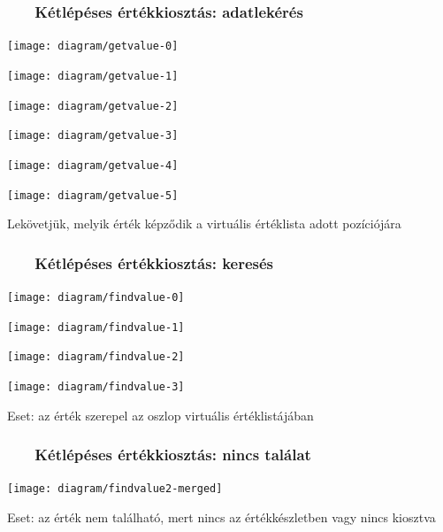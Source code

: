 \documentclass[
    aspectratio=169,
]{beamer}
\newcommand{\slidetitle}[2]{\frametitle{{\small #1 ~ \ding{226} ~ } \normalsize \textbf{#2} }}
\begin{document}
\begin{frame}
    \slidetitle{\sectionshorttitle}{Kétlépéses értékkiosztás: adatlekérés}
    
    \centering
    
    \begin{overprint}
        \centerline{\texttt{[image: diagram/getvalue-0]}}
        \centerline{\texttt{[image: diagram/getvalue-1]}}
        \centerline{\texttt{[image: diagram/getvalue-2]}}
        \centerline{\texttt{[image: diagram/getvalue-3]}}
        \centerline{\texttt{[image: diagram/getvalue-4]}}
        \centerline{\texttt{[image: diagram/getvalue-5]}}
    \end{overprint}
    
    \hspace{0.7cm}
    
    Lekövetjük, melyik érték képződik a virtuális értéklista adott pozíciójára
\end{frame}

\begin{frame}
    \slidetitle{\sectionshorttitle}{Kétlépéses értékkiosztás: keresés}
    
    \centering
    
    \begin{overprint}
        \centerline{\texttt{[image: diagram/findvalue-0]}}
        \centerline{\texttt{[image: diagram/findvalue-1]}}
        \centerline{\texttt{[image: diagram/findvalue-2]}}
        \centerline{\texttt{[image: diagram/findvalue-3]}}
    \end{overprint}
    
    \vspace{0.7cm}
    
    Eset: az érték szerepel az oszlop virtuális értéklistájában
\end{frame}

\begin{frame}
    \slidetitle{\sectionshorttitle}{Kétlépéses értékkiosztás: nincs találat}
    
    \centering
    
    \texttt{[image: diagram/findvalue2-merged]}
    
    \vspace{0.7cm}
    
    Eset: az érték nem található, mert nincs az értékkészletben vagy nincs kiosztva
\end{frame}
\end{document}
